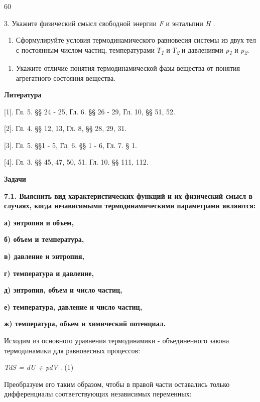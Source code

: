 60

3. Укажите физический смысл свободной энергии \emph{F} и энтальпии
\emph{H} .

\begin{enumerate}
\def\labelenumi{\arabic{enumi}.}
\setcounter{enumi}{3}
\item
  Сформулируйте условия термодинамического равновесия системы из двух
  тел с постоянным числом частиц, температурами
  \emph{Т\textsubscript{1}} и \emph{Т\textsubscript{2}} и давлениями
  \emph{p\textsubscript{1}} и \emph{p\textsubscript{2}}.
\end{enumerate}

\begin{enumerate}
\def\labelenumi{\arabic{enumi}.}
\setcounter{enumi}{3}
\item
  Укажите отличие понятия термодинамической фазы вещества от понятия
  агрегатного состояния вещества.
\end{enumerate}

\textbf{Литература}

{[}1{]}. Гл. 5. §§ 24 - 25, Гл. 6. §§ 26 - 29, Гл. 10, §§ 51, 52.

{[}2{]}. Гл. 4. §§ 12, 13, Гл. 8, §§ 28, 29, 31.

{[}3{]}. Гл. 5. §§1 - 5, Гл. 6. §§ 1 - 6, Гл. 7. § 1.

{[}4{]}. Гл. 3. §§ 45, 47, 50, 51. Гл. 10. §§ 111, 112.

\textbf{Задачи}

\textbf{7.1. Выяснить вид характеристических функций и их физический
смысл в случаях, когда независимыми термодинамическими параметрами
являются:}

\textbf{а) энтропия и объем,}

\textbf{б) объем и температура,}

\textbf{в) давление и энтропия,}

\textbf{г) температура и давление,}

\textbf{д) энтропия, объем и число частиц,}

\textbf{е) температура, давление и число частиц,}

\textbf{ж) температура, объем и химический потенциал.}

\solving{}

Исходим из основного уравнения термодинамики - объединенного закона
термодинамики для равновесных процессов:

\emph{TdS = dU + pdV} . (1)

Преобразуем его таким образом, чтобы в правой части оставались только
дифференциалы соответствующих независимых переменных:

